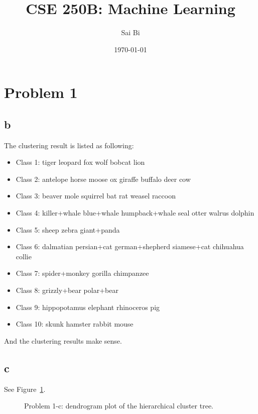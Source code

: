 \documentclass[a4paper,11pt]{article}
\theoremstyle{mytheor}
\begin{document}
\title{CSE 250B: Machine Learning}

\author{Sai Bi}

\date{\today}

\maketitle

\section*{Problem 1}
\subsection*{b}
The clustering result is listed as following:
\begin{itemize}
	\item Class 1: tiger leopard fox wolf bobcat lion 
	\item Class 2: antelope horse moose ox giraffe buffalo deer cow 
	\item Class 3: beaver mole squirrel bat rat weasel raccoon 
	\item Class 4: killer+whale blue+whale humpback+whale seal otter walrus dolphin 
    \item Class 5: sheep zebra giant+panda 
    \item Class 6: dalmatian persian+cat german+shepherd siamese+cat chihuahua collie 
   
    \item Class 7:    spider+monkey gorilla chimpanzee 
    
    \item Class 8: grizzly+bear polar+bear 
    
    \item Class 9: hippopotamus elephant rhinoceros pig 
    
    \item Class 10: skunk hamster rabbit mouse 
\end{itemize}
And the clustering results make sense.

\subsection*{c}
See Figure~\ref{fig:1c}.
\begin{figure}
     \caption{Problem 1-c: dendrogram plot of the hierarchical cluster tree.}
     \label{fig:1c}
\end{figure}
\end{document}
